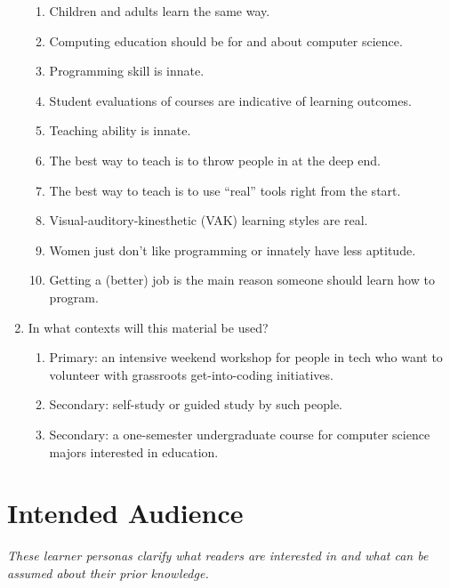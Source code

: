 \begin{enumerate}
  \begin{enumerate}
  \item
    Children and adults learn the same way.
  \item
    Computing education should be for and about computer science.
  \item
    Programming skill is innate.
  \item
    Student evaluations of courses are indicative of learning
    outcomes.
  \item
    Teaching ability is innate.
  \item
    The best way to teach is to throw people in at the deep end.
  \item
    The best way to teach is to use ``real'' tools right from the
    start.
  \item
    Visual-auditory-kinesthetic (VAK) learning styles are real.
  \item
    Women just don't like programming or innately have less
    aptitude.
  \item
    Getting a (better) job is the main reason someone should learn
    how to program.
  \end{enumerate}
\item
  In what contexts will this material be used?

  \begin{enumerate}
  \item
    Primary: an intensive weekend workshop for people in tech who
    want to volunteer with grassroots get-into-coding initiatives.
  \item
    Secondary: self-study or guided study by such people.
  \item
    Secondary: a one-semester undergraduate course for computer
    science majors interested in education.
  \end{enumerate}
\end{enumerate}

\section{Intended Audience}\label{intended-audience}

\emph{These learner personas clarify what readers are interested in and what
can be assumed about their prior knowledge.}

